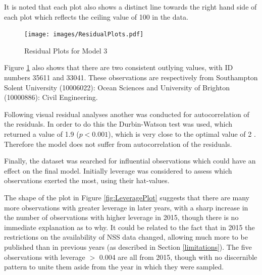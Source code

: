 \documentclass[11pt,a4paper]{report}
\begin{document}
It is noted that each plot also shows a distinct line towards the right hand side of each plot which reflects the ceiling value of 100 in the data. 

	\begin{figure}
		\begin{center}
			\texttt{[image: images/ResidualPlots.pdf]}~\\		
		\end{center}
		\caption{Residual Plots for Model 3}
		\label{fig:resids}
	\end{figure}
	
Figure \ref{fig:resids} also shows that there are two consistent outlying values, with ID numbers 35611 and 33041. These observations are respectively from Southampton Solent University (10006022): Ocean Sciences and University of Brighton (10000886): Civil Engineering. 

Following visual residual analyses another was conducted for autocorrelation of the residuals. In order to do this the Durbin-Watson test was used, which returned a value of 1.9 ($p < 0.001$), which is very close to the optimal value of 2 \cite{durbin1950testing}. Therefore the model does not suffer from autocorrelation of the residuals. 

Finally, the dataset was searched for influential observations which could have an effect on the final model. Initially leverage was considered to assess which observations exerted the most, using their hat-values. 

The shape of the plot in Figure \ref{fig:LeveragePlot} suggests that there are many more observations with greater leverage in later years, with a sharp increase in the number of observations with higher leverage in 2015, though there is no immediate explanation as to why. It could be related to the fact that in 2015 the restrictions on the availability of NSS data changed, allowing much more to be published than in previous years (as described in Section \ref{limitations}). The five observations with leverage $>$ 0.004 are all from 2015, though with no discernible pattern to unite them aside from the year in which they were sampled. 
\end{document}
